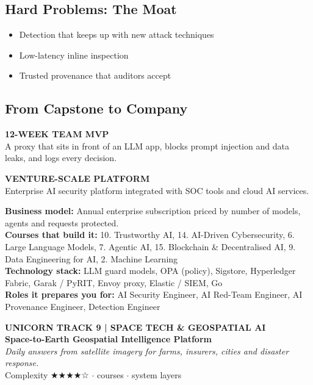\documentclass[10pt,a4paper]{article}
\begin{document}
\subsection*{Hard Problems: The Moat}\begin{itemize}\small
\item Detection that keeps up with new attack techniques
\item Low-latency inline inspection
\item Trusted provenance that auditors accept
\end{itemize}
\subsection*{From Capstone to Company}
\begin{tcbraster}[raster columns=2,raster equal height,raster column skip=8pt]\begin{tcolorbox}[colback=l1bg,colframe=l1bg,arc=2pt,borderline north={2.5pt}{0pt}{saffron}]{\scriptsize\bfseries\color{muted}12-WEEK TEAM MVP}\\\small A proxy that sits in front of an LLM app, blocks prompt injection and data leaks, and logs every decision.\end{tcolorbox}\begin{tcolorbox}[colback=l3bg,colframe=l3bg,arc=2pt,borderline north={2.5pt}{0pt}{igreen}]{\scriptsize\bfseries\color{muted}VENTURE-SCALE PLATFORM}\\\small Enterprise AI security platform integrated with SOC tools and cloud AI services.\end{tcolorbox}\end{tcbraster}
{\small\textbf{Business model:} Annual enterprise subscription priced by number of models, agents and requests protected.\\\textbf{Courses that build it:} 10. Trustworthy AI, 14. AI-Driven Cybersecurity, 6. Large Language Models, 7. Agentic AI, 15. Blockchain \& Decentralised AI, 9. Data Engineering for AI, 2. Machine Learning\\\textbf{Technology stack:} LLM guard models, OPA (policy), Sigstore, Hyperledger Fabric, Garak / PyRIT, Envoy proxy, Elastic / SIEM, Go\\\textbf{Roles it prepares you for:} AI Security Engineer, AI Red-Team Engineer, AI Provenance Engineer, Detection Engineer}
\newpage
\begin{tcolorbox}[colback=navy,colframe=navy,arc=2pt,left=8pt,top=5pt,bottom=5pt]{\small\bfseries\color{goldl}UNICORN TRACK 9 \;|\; SPACE TECH \& GEOSPATIAL AI}\\[1pt]{\LARGE\bfseries\color{white}Space-to-Earth Geospatial Intelligence Platform}\\[2pt]{\small\itshape\color{goldl}Daily answers from satellite imagery for farms, insurers, cities and disaster response.}\\[2pt]{\small\color{white}Complexity {\color{goldl}★★★★☆} \;$\cdot$ courses \;$\cdot$ system layers}\end{tcolorbox}
\end{document}
